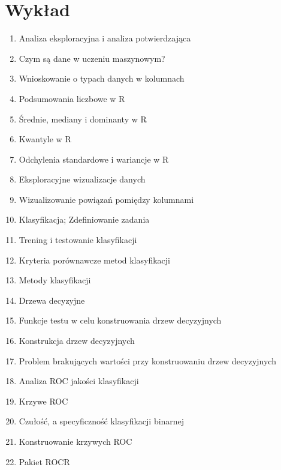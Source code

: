 \documentclass[11pt]{article}
\begin{document}
    \section{Wykład}
    \begin{enumerate}
        \item Analiza eksploracyjna i analiza potwierdzająca
        \item Czym są dane w uczeniu maszynowym?
        \item Wnioskowanie o typach danych w kolumnach
        \item Podsumowania liczbowe w R
        \item Średnie, mediany i dominanty w R
        \item Kwantyle w R
        \item Odchylenia standardowe i wariancje w R
        \item Eksploracyjne wizualizacje danych
        \item Wizualizowanie powiązań pomiędzy kolumnami
        \item Klasyfikacja; Zdefiniowanie zadania
        \item Trening i testowanie klasyfikacji
        \item Kryteria porównawcze metod klasyfikacji
        \item Metody klasyfikacji
        \item Drzewa decyzyjne
        \item Funkcje testu w celu konstruowania drzew decyzyjnych
        \item Konstrukcja drzew decyzyjnych
        \item Problem brakujących wartości przy konstruowaniu drzew decyzyjnych
        \item Analiza ROC jakości klasyfikacji
        \item Krzywe ROC
        \item Czułość, a specyficzność klasyfikacji binarnej
        \item Konstruowanie krzywych ROC
        \item Pakiet ROCR
    \end{enumerate}
    
\end{document}
